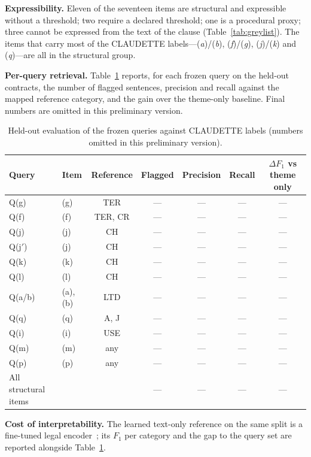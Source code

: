 \documentclass{IOS-Book-Article}
\newcommand{\corpus}{CLAUDETTE}
\newcommand{\gi}[1]{(\textit{#1})}
\begin{document}
\textbf{Expressibility.} Eleven of the seventeen items are structural and expressible without a threshold; two require a declared threshold; one is a procedural proxy; three cannot be expressed from the text of the clause (Table~\ref{tab:greylist}). The items that carry most of the \corpus{} labels---\gi{a}/\gi{b}, \gi{f}/\gi{g}, \gi{j}/\gi{k} and \gi{q}---are all in the structural group.

\textbf{Per-query retrieval.} Table~\ref{tab:queries} reports, for each frozen query on the held-out contracts, the number of flagged sentences, precision and recall against the mapped reference category, and the gain over the theme-only baseline. Final numbers are omitted in this preliminary version.

\begin{table}[t]
\caption{Held-out evaluation of the frozen queries against \corpus{} labels (numbers omitted in this preliminary version).}
\label{tab:queries}
\centering
\footnotesize\setlength{\tabcolsep}{4pt}%
\begin{tabular}{llccccc}
\toprule
Query & Item & Reference & Flagged & Precision & Recall & $\Delta F_1$ vs theme only \\
\midrule
Q(g)   & (g)   & TER     & --- & --- & --- & --- \\
Q(f)   & (f)   & TER, CR & --- & --- & --- & --- \\
Q(j)   & (j)   & CH      & --- & --- & --- & --- \\
Q(j$'$)& (j)   & CH      & --- & --- & --- & --- \\
Q(k)   & (k)   & CH      & --- & --- & --- & --- \\
Q(l)   & (l)   & CH      & --- & --- & --- & --- \\
Q(a/b) & (a),(b) & LTD   & --- & --- & --- & --- \\
Q(q)   & (q)   & A, J    & --- & --- & --- & --- \\
Q(i)   & (i)   & USE     & --- & --- & --- & --- \\
Q(m)   & (m)   & any     & --- & --- & --- & --- \\
Q(p)   & (p)   & any     & --- & --- & --- & --- \\
\midrule
All structural items & & & --- & --- & --- & --- \\
\bottomrule
\end{tabular}
\end{table}

\textbf{Cost of interpretability.} The learned text-only reference on the same split is a fine-tuned legal encoder~\cite{chalkidis2020legalbert}; its $F_1$ per category and the gap to the query set are reported alongside Table~\ref{tab:queries}.
\end{document}
